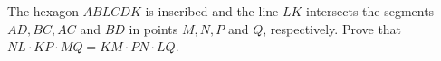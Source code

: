 The hexagon $ABLCDK$ is inscribed and the line $LK$ intersects the segments $AD, BC, AC$ and $BD$ in points $M, N, P$ and $Q$, respectively. Prove that $NL \cdot KP \cdot MQ = KM \cdot  PN \cdot  LQ$.